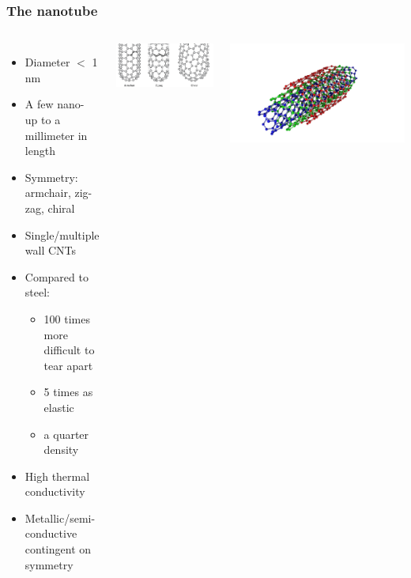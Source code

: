\documentclass{beamer}
\begin{document}
\begin{frame}
	\frametitle{The nanotube}
	\begin{columns}
		\begin{itemize}
			\item Diameter $<$ 1 nm
			\item A few nano- up to a millimeter in length
			\item Symmetry: armchair, zig-zag, chiral
			\item Single/multiple wall CNTs
			\item Compared to steel:
				\begin{itemize}
					\item 100 times more difficult to tear apart
					\item 5 times as elastic
					\item a quarter density
				\end{itemize}
			\item High thermal conductivity
			\item Metallic/semi-conductive contingent on symmetry
		\end{itemize}
		\begin{minipage}{.5\textheight}
			\includegraphics[scale=.65]{nanotube_orientations}
		\end{minipage}
	\begin{minipage}{.5\textheight}
		\includegraphics[scale=.1]{MWCNT}
	\end{minipage}
	\end{columns}
\end{frame}
\end{document}
